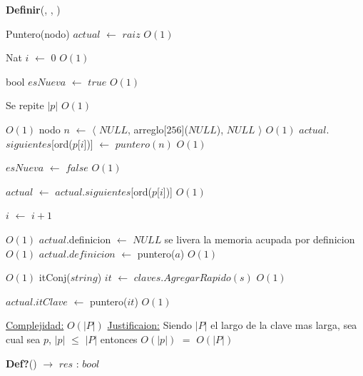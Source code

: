 \begin{Algoritmos}
\begin{algorithm}[H]
\begin{algorithmic}[1]
\end{algorithmic}
\end{algorithm}
  

\begin{algorithm}[H]
{\textbf{Definir}(, , )}
\begin{algorithmic}[1]

\State Puntero(nodo) $actual$ $\gets$ $raiz$ \Comment $O(1)$

\State Nat $i$ $\gets$ $0$ \Comment $O(1)$

\State bool $esNueva$ $\gets$ $true$ \Comment $O(1)$

   \Comment Se repite $|p|$ $O(1)$
	
	
	 \Comment $O(1)$
		\State nodo $n$ $\gets$ $\langle$ $NULL$, arreglo[$256$]($NULL$), $NULL$ $\rangle$ \Comment $O(1)$
		\State $actual$.$siguientes$[ord($p$[$i$])] $\gets$	 $puntero(n)$ \Comment $O(1)$
		
		\State $esNueva$ $\gets$ $false$ \Comment $O(1)$	 
	
	\EndIf
	
	\State $actual$ $\gets$ $actual$.$siguientes$[ord($p$[$i$])] \Comment $O(1)$

	\State $i$ $\gets$ $i + 1$
\EndWhile 

 \Comment $O(1)$
	\State $actual$.definicion $\gets$ $NULL$ \Comment se livera la memoria acupada por definicion $O(1)$
\EndIf
\State $actual$.$definicion$ $\gets$ puntero($a$) \Comment $O(1)$

 \Comment $O(1)$
	\State itConj($string$) $it$ $\gets$  $claves.AgregarRapido(s)$ \Comment $O(1)$
	
	\State $actual$.$itClave$ $\gets$ puntero($it$) \Comment $O(1)$
\EndIf

\medskip
\State \underline{Complejidad:} $O(|P|)$
\State \underline{Justificaion:} Siendo $|P|$ el largo de la clave mas larga, sea cual sea $p$, $|p|$ $\leq$ $|P|$ entonces 	$O(|p|)$ $=$ $O(|P|)$


\end{algorithmic}
\end{algorithm}  
  
  
\begin{algorithm}[H]
{\textbf{Def?}() $\to$ $res$ : $bool$}
\begin{algorithmic}[1]


\end{algorithmic}
\end{algorithm}
\end{Algoritmos}
